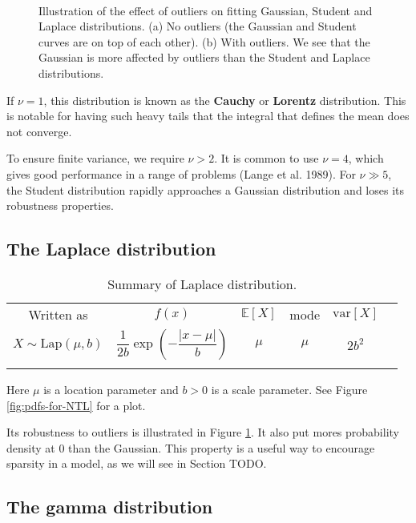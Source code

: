 \begin{figure}[hbtp]
\centering
{} \\
\caption{Illustration of the effect of outliers on fitting Gaussian, Student and Laplace distributions. (a) No outliers (the Gaussian and Student curves are on top of each other). (b) With outliers. We see that the Gaussian is more affected by outliers than the Student and Laplace distributions.}
\label{fig:robustness} 
\end{figure}

If $\nu=1$, this distribution is known as the \textbf{Cauchy} or \textbf{Lorentz} distribution. This is notable for having such heavy tails that the integral that defines the mean does not converge.

To ensure finite variance, we require $\nu>2$. It is common to use $\nu=4$, which gives good performance in a range of problems (Lange et al. 1989). For $\nu \gg 5$, the Student distribution rapidly approaches a Gaussian distribution and loses its robustness properties.


\subsection{The Laplace distribution}
\begin{table}
\caption{Summary of Laplace distribution.}
\centering
\begin{tabular}{cccccc}
\hline\noalign{\smallskip}
Written as & $f(x)$ & $\mathbb{E}[X]$ & mode & $\text{var}[X]$ \\
\noalign{\smallskip}\svhline\noalign{\smallskip}
$X \sim \text{Lap}(\mu,b)$ & $\dfrac{1}{2b}\exp\left(-\dfrac{|x-\mu|}{b}\right)$ & $\mu$ & $\mu$ & $2b^2$ \\
\noalign{\smallskip}\hline
\end{tabular}
\end{table}

Here $\mu$ is a location parameter and $b>0$ is a scale parameter. See Figure \ref{fig:pdfs-for-NTL} for a plot.

Its robustness to outliers is illustrated in Figure \ref{fig:robustness}. It also put mores probability density at 0 than the Gaussian. This property is a useful way to encourage sparsity in a model, as we will see in Section TODO.


\subsection{The gamma distribution}

